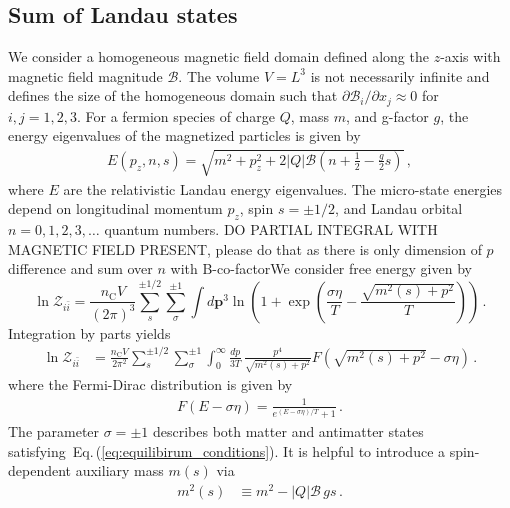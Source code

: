 \documentclass[epjST]{svjour}
\newcommand{\req}[1]{Eq.\,(\ref{#1})}
\begin{document}
\subsection{Sum of Landau states}
\label{sec:Landau}
We consider a homogeneous magnetic field domain defined along the $z$-axis with magnetic field magnitude $\mathcal{B}$. The volume $V=L^{3}$ is not necessarily infinite and defines the size of the homogeneous domain such that $\partial\mathcal{B}_{i}/\partial x_{j}\approx0$ for \(i,j=1,2,3\). For a fermion species of charge $Q$, mass $m$, and g-factor $g$, the energy eigenvalues of the magnetized particles is given by~\cite{Steinmetz:2018ryf}
\begin{align}
\label{eq:energystates}
E(p_{z},n,s)=\sqrt{m^{2}+p_{z}^{2}+2|Q|\mathcal{B}\left(n+\frac{1}{2}-\frac{g}{2}s\right)}\,,
\end{align}
where $E$ are the relativistic Landau energy eigenvalues. The micro-state energies depend on longitudinal momentum \(p_{z}\), spin $s=\pm1/2$, and Landau orbital $n=0,1,2,3,\ldots$ quantum numbers. {\color{red}DO PARTIAL INTEGRAL WITH MAGNETIC FIELD PRESENT, please do that as there is only dimension of $p$ difference and sum over $n$ with B-co-factor}{\color{blue}We consider free energy given by 
\begin{equation}
 \ln\mathcal{Z}_{i\bar{i}} = \frac{n_\mathrm{C}V}{(2\pi)^{3}}\sum_{s}^{\pm1/2}\sum_{\sigma}^{\pm1}\int d\mathbf{p}^{3}\ln\left(1+\exp{\left(\frac{\sigma\eta}{T}-\frac{\sqrt{m^2(s)+p^{2}}}{T}\right)}\right)\,.
\end{equation}
Integration by parts yields
\begin{align}
\label{eq:partition_byparts}
\ln\mathcal{Z}_{i\bar{i}} &= \frac{n_\mathrm{C}V}{2\pi^{2}} \sum_{s}^{\pm1/2}\sum_{\sigma}^{\pm1}\int_{0}^{\infty} \frac{dp}{3T} \, \frac{p^4}{\sqrt{m^2(s)+p^{2}}}F\left(\sqrt{m^2(s)+p^{2}} - \sigma\eta\right)\,.
\end{align}
where} the Fermi-Dirac distribution is given by
\begin{align}
\label{eq:FermiDirac}
F\left(E - \sigma\eta\right) = \frac{1}{e^{(E - \sigma\eta)/T} + 1}\,.
\end{align}
The parameter \(\sigma=\pm1\) describes both matter and antimatter states satisfying~\req{eq:equilibirum_conditions}. It is helpful to introduce a spin-dependent auxiliary mass $m(s)$ via
\begin{align}
\label{eq:spinmass}
m^{2}(s) &\equiv m^{2} - |Q|\mathcal{B}\,g s\,.
\end{align}
\end{document}

